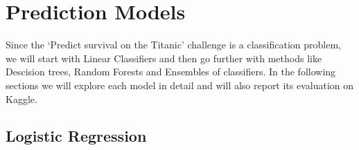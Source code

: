 \documentclass[a4paper,10pt]{report}
\begin{document}
\chapter{Prediction Models}
Since the `Predict survival on the Titanic' challenge is a classification problem, we will start with Linear Classifiers and then go further with methods like Descision trees, Random Forests and Ensembles of classifiers. In the following sections we will explore each model in detail and will also report its evaluation on Kaggle.

\section{Logistic Regression}
\end{document}
